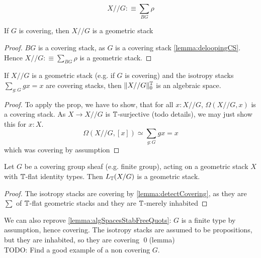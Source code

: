 \[
X // G :\equiv \sum_{BG} \rho
\]
\begin{lemma}
	If $G$ is covering, then $X // G$ is a geometric stack
\end{lemma}
\begin{proof}
	$BG$ is a covering stack, as $G$ is a covering stack \ref{lemma:deloopingCS}. Hence $X // G :\equiv \sum_{BG} \rho$ is a geometric stack.
\end{proof}
\begin{prop}
	If $X // G$ is a geometric stack (e.g. if $G$ is covering) and the isotropy stacks $\sum_{g : G} g x = x$ are covering stacks, then $\| X // G \|_0^{\mathbb{T}}$ is an algebraic space.
\end{prop}
\begin{proof}
	To apply the prop, we have to show, that for all $x : X // G$, $\Omega (X // G,x)$ is a covering stack. As $X \to X // G$ is $\mathbb{T}$-surjective (todo details), we may just show this for $x : X$.
	\[
	\Omega (X // G , [x]) \simeq \sum_{g: G} g x = x
	\]
	which was covering by assumption
\end{proof}
\begin{corollary}
	 Let $G$ be a covering group sheaf (e.g. finite group), acting on a geometric stack $X$ with  $\mathbb{T}$-flat identity types. Then $L_{\mathbb{T}} (X / G)$ is a geometric stack.
\end{corollary}
\begin{proof}
	The isotropy stacks are covering by \ref{lemma:detectCovering}, as they are $\sum$ of $\mathbb{T}$-flat geometric stacks and they are $\mathbb{T}$-merely inhabited 
\end{proof}
We can also reprove \ref{lemma:algSpacesStabFreeQuots}: $G$ is a finite type by assumption, hence covering. The isotropy stacks are assumed to be propositions, but they are inhabited, so they are covering \qed(lemma) \\

TODO: Find a good example of a non covering $G$.